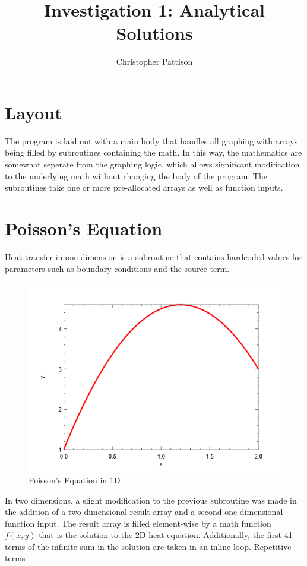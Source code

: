 \documentclass[12pt,twocolumn]{article}
\title{\vspace{-2.5em}Investigation 1: Analytical Solutions}
\author{Christopher Pattison}
\date{}
\begin{document}
\maketitle
\newpage
\section*{Layout}
The program is laid out with a main body that handles all graphing with arrays being filled by subroutines containing the math. In this way, the mathematics are somewhat seperate from the graphing logic,
which allows significant modification to the underlying math without changing the body of the program. The subroutines take one or more pre-allocated arrays as well as function inputs.
\section*{Poisson's Equation}
Heat transfer in one dimension is a subroutine that contains hardcoded values for parameters such as boundary conditions and the source term.
\begin{figure}
\includegraphics[width=\columnwidth]{1dheat.png}
\footnotesize{\caption{Poisson's Equation in 1D}}
\end{figure}
In two dimensions, a slight modification to the previous subroutine was made in the addition of a two dimensional result array and a second one dimensional function input. The result array is filled element-wise by a math function $f(x,y)$ that is the solution to the 
2D heat equation. Additionally, the first 41 terms of the infinite sum in the solution are taken in an inline loop. Repetitive terms 
\end{document}
